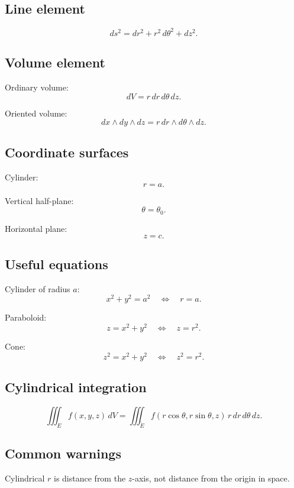 \subsection*{Line element}

\[
\boxed{
    ds^2=dr^2+r^2\,d\theta^2+dz^2.
}
\]

\subsection*{Volume element}

Ordinary volume:
\[
\boxed{
    dV=r\,dr\,d\theta\,dz.
}
\]

Oriented volume:
\[
\boxed{
    dx\wedge dy\wedge dz
    =
    r\,dr\wedge d\theta\wedge dz.
}
\]

\subsection*{Coordinate surfaces}

Cylinder:
\[
\boxed{
    r=a.
}
\]

Vertical half-plane:
\[
\boxed{
    \theta=\theta_0.
}
\]

Horizontal plane:
\[
\boxed{
    z=c.
}
\]

\subsection*{Useful equations}

Cylinder of radius \(a\):
\[
\boxed{
    x^2+y^2=a^2
    \quad\Longleftrightarrow\quad
    r=a.
}
\]

Paraboloid:
\[
\boxed{
    z=x^2+y^2
    \quad\Longleftrightarrow\quad
    z=r^2.
}
\]

Cone:
\[
\boxed{
    z^2=x^2+y^2
    \quad\Longleftrightarrow\quad
    z^2=r^2.
}
\]

\subsection*{Cylindrical integration}

\[
\boxed{
    \iiint_E f(x,y,z)\,dV
    =
    \iiint_{\widetilde E}
    f(r\cos\theta,r\sin\theta,z)\,
    r\,dr\,d\theta\,dz.
}
\]

\subsection*{Common warnings}

Cylindrical \(r\) is distance from the \(z\)-axis, not distance from the origin in space.

